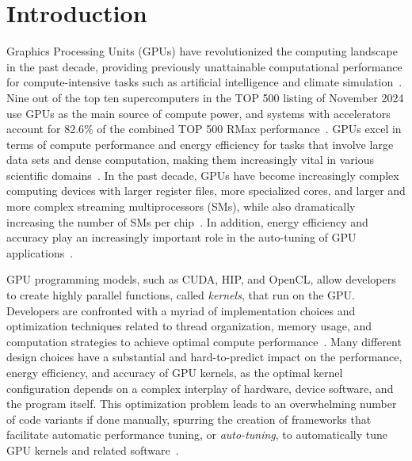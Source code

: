 \section{Introduction}
\label{sec:introduction}

Graphics Processing Units (GPUs) have revolutionized the computing landscape in the past decade, providing previously unattainable computational performance for compute-intensive tasks such as artificial intelligence and climate simulation~\cite{heldens2020landscape,lecun2015deep}. 
Nine out of the top ten supercomputers in the TOP 500 listing of November 2024 use GPUs as the main source of compute power, and systems with accelerators account for 82.6\% of the combined TOP 500 RMax performance~\cite{TOP500November2024}.   %
GPUs excel in terms of compute performance and energy efficiency for tasks that involve large data sets and dense computation, making them increasingly vital in various scientific domains~\cite{lessonsLearnedGPU2020}. 
In the past decade, GPUs have become increasingly complex computing devices with larger register files, more specialized cores, and larger and more complex streaming multiprocessors (SMs), while also dramatically increasing the number of SMs per chip~\cite{hijma2023optimization}. 
In addition, energy efficiency and accuracy play an increasingly important role in the auto-tuning of GPU applications~\cite{schoonhovenGoingGreenOptimizing2022, heldensKernelLauncherLibrary2023}. 

GPU programming models, such as CUDA, HIP, and OpenCL, allow developers to create highly parallel functions, called {\em kernels}, that run on the GPU. 
Developers are confronted with a myriad of implementation choices and optimization techniques related to thread organization, memory usage, and computation strategies to achieve optimal compute performance~\cite{hijma2023optimization}. 
Many different design choices have a substantial and hard-to-predict impact on the performance, energy efficiency, and accuracy of GPU kernels, as the optimal kernel configuration depends on a complex interplay of hardware, device software, and the program itself.
This optimization problem leads to an overwhelming number of code variants if done manually, spurring the creation of frameworks that facilitate automatic performance tuning, or {\em auto-tuning}, to automatically tune GPU kernels and related software~\cite{OpenTuner, CLTune, KTT, ATF, vanwerkhovenKernelTunerSearchoptimizing2019}.


